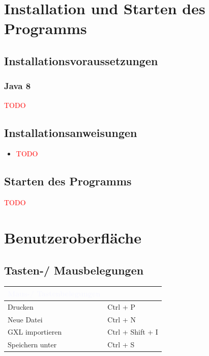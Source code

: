 \documentclass[enabledeprecatedfontcommands,fontsize=11pt,paper=a4,twoside]{scrartcl}
\newcommand*{\red}{\textcolor{red}}
\begin{document}
\newpage
\section{Installation und Starten des Programms} \label{sec:installation}

	\subsection{Installationsvoraussetzungen}
		\subsubsection{Java 8}
		\red{TODO}

	\subsection{Installationsanweisungen}
		\begin{itemize}
			\item \red{TODO}
		\end{itemize}
	\subsection{Starten des Programms}
		\red{TODO}

\newpage	
\section{Benutzeroberfläche}
	\subsection{Tasten-/ Mausbelegungen}
	
	\begin{tabular} {|p{8cm}|p{8cm}|}
		\hline
		\rowcolor{glaucous}\multicolumn{2}{|l|} {\parbox{16cm}{\textbf{\textcolor{ghostwhite}{Maus-/ Tastenbelegungen}}} } \\ \hline\hline 	
		 Drucken	& Ctrl + P \\ \hline
		 Neue Datei	& Ctrl + N \\ \hline
		 GXL importieren	& Ctrl + Shift + I \\ \hline
		 Speichern unter	&	Ctrl + S \\ \hline
	\end{tabular}
	
\end{document}
